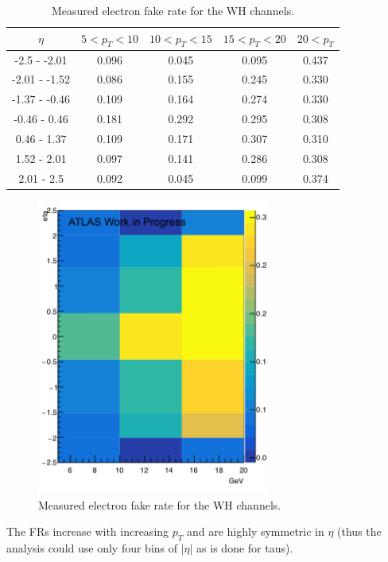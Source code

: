 \begin{table}[htb!]
    \centering
    \begin{tabular}{|c|c|c|c|c|}
    \hline
    $\eta$ & $5<p_T<10$ & $10<p_T<15$ & $15<p_T<20$ & $20<p_T$ \\
    \hline
    -2.5 - -2.01 & 0.096 & 0.045 & 0.095 & 0.437 \\
    -2.01 - -1.52 & 0.086 & 0.155 & 0.245 & 0.330 \\
    -1.37 - -0.46 & 0.109 & 0.164 & 0.274 & 0.330\\
    -0.46 - 0.46 & 0.181 & 0.292 & 0.295 & 0.308\\
    0.46 - 1.37 & 0.109 & 0.171 & 0.307 & 0.310\\
    1.52 - 2.01 & 0.097 & 0.141 & 0.286 & 0.308\\
    2.01 - 2.5 & 0.092 & 0.045 & 0.099 & 0.374\\
    \hline
    \end{tabular}
    \caption{Measured electron fake rate for the WH channels.}
    \label{tab:wh_frs}
\end{table}

\begin{figure}[htb!]
    \centering
    \includegraphics[width=3in]{figures/chapter7/data17_wh_frs.pdf}
    \caption{Measured electron fake rate for the WH channels.}
    \label{fig:wh_frs}
\end{figure}

The FRs increase with increasing $p_T$ and are highly symmetric in $\eta$ (thus the analysis could use only four bins of $|\eta|$ as is done for taus).

\pagebreak

